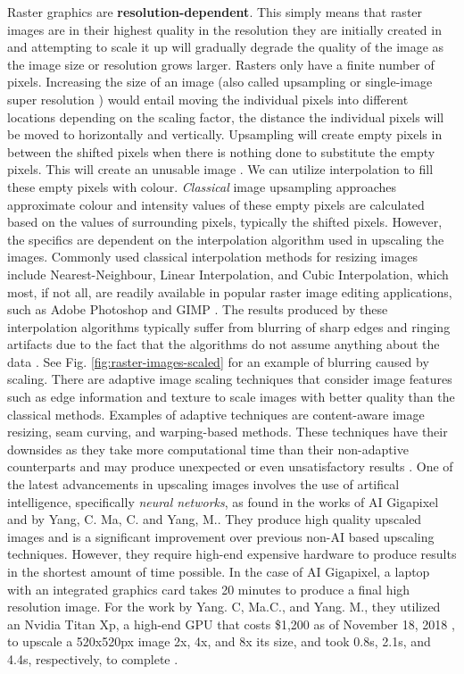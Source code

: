 Raster graphics are \textbf{resolution-dependent}. This simply means that raster images are in their highest quality in the resolution they are initially created in and attempting to scale it up will gradually degrade the quality of the image as the image size or resolution grows larger. Rasters only have a finite number of pixels. Increasing the size of an image (also called upsampling \cite{hoshyari2018perceptiondriven} or single-image super resolution \cite{sisrbenchmark}) would entail moving the individual pixels into different locations depending on the scaling factor, the distance the individual pixels will be moved to horizontally and vertically. Upsampling will create empty pixels in between the shifted pixels when there is nothing done to substitute the empty pixels. This will create an unusable image \cite{resizingimages}. We can utilize interpolation to fill these empty pixels with colour. \textit{Classical} image upsampling approaches approximate colour and intensity values of these empty pixels are calculated based on the values of surrounding pixels, typically the shifted pixels. However, the specifics are dependent on the interpolation algorithm used in upscaling the images. Commonly used classical interpolation methods for resizing images include Nearest-Neighbour, Linear Interpolation, and Cubic Interpolation, which most, if not all, are readily available in popular raster image editing applications, such as Adobe Photoshop \cite{photoshopinterpolationmethods} and GIMP \cite{gimpinterpolationmethods}. The results produced by these interpolation algorithms typically suffer from blurring of sharp edges and ringing artifacts due to the fact that the algorithms do not assume anything about the data \cite{depixelizingpixelart}\cite{interpolationtechniquessurvey}. See Fig. \ref{fig:raster-images-scaled} for an example of blurring caused by scaling. There are adaptive image scaling techniques that consider image features such as edge information and texture to scale images with better quality than the classical methods. Examples of adaptive techniques are content-aware image resizing, seam curving, and warping-based methods. These techniques have their downsides as they take more computational time than their non-adaptive counterparts and may produce unexpected or even unsatisfactory results \cite{interpolationtechniquessurvey}. One of the latest advancements in upscaling images involves the use of artifical intelligence, specifically \textit{neural networks}, as found in the works of AI Gigapixel and by Yang, C. Ma, C. and Yang, M.. They produce high quality upscaled images and is a significant improvement over previous non-AI based upscaling techniques. However, they require high-end expensive hardware to produce results in the shortest amount of time possible. In the case of AI Gigapixel, a laptop with an integrated graphics card takes 20 minutes to produce a final high resolution image. For the work by Yang. C, Ma.C., and Yang. M., they utilized an Nvidia Titan Xp, a high-end GPU that costs \$1,200 as of November 18, 2018 \cite{titanxppage}, to upscale a 520x520px image 2x, 4x, and 8x its size, and took 0.8s, 2.1s, and 4.4s, respectively, to complete \cite{aigigapixelstory}\cite{progressivesisr}.

